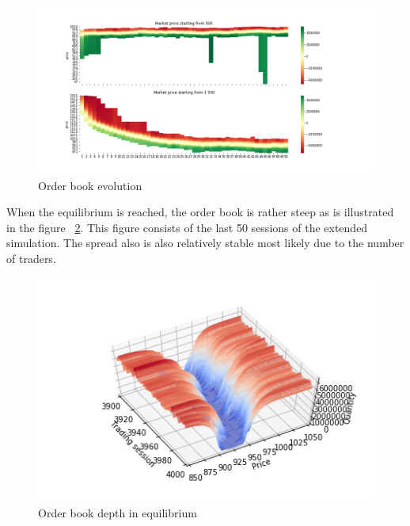 
\begin{figure}[H]
    \includegraphics[width=\linewidth]{plots/basic_order_book_evo.png}
    \caption{Order book evolution}
    \label{fig:basic_orderbook_evo}
\end{figure}

When the equilibrium is reached, the order book is rather steep as is illustrated in the figure
~\ref{fig:basic_orderbook_evo}. This figure consists of the last 50 sessions of the extended simulation.
The spread also is also relatively stable most likely due to the number of traders. 

\begin{figure}[H]
    \includegraphics[width=\linewidth]{plots/basic_market_depth_in_equilibrium.png}
    \caption{Order book depth in equilibrium}
    \label{fig:basic_orderbook_evo}
\end{figure}


